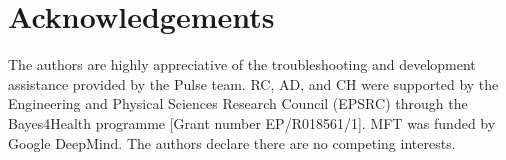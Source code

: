 \section*{Acknowledgements}

The authors are highly appreciative of the troubleshooting and development assistance provided by the Pulse team.
RC, AD, and CH were supported by the Engineering and Physical Sciences Research Council (EPSRC) through the Bayes4Health programme [Grant number EP/R018561/1].
MFT was funded by Google DeepMind.
The authors declare there are no competing interests.
